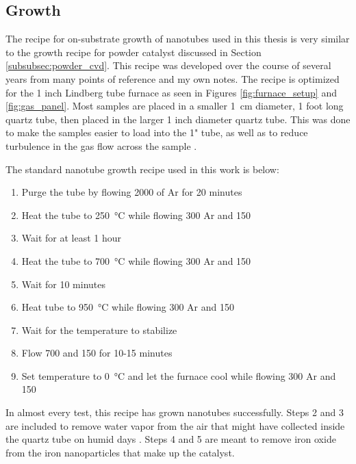 \subsection{Growth}
\label{subsubsec:substrate_cvd}

The recipe for on-substrate growth of nanotubes used in this thesis is very similar to the growth recipe for powder catalyst discussed in Section \ref{subsubsec:powder_cvd}. This recipe was developed over the course of several years from many points of reference \cite{Kong1998, Kong1998a, Dirks2010, Huang2003, Huang2004, Zhang2013, Hong2005} and my own notes. The recipe is optimized for the 1 inch Lindberg tube furnace as seen in Figures \ref{fig:furnace_setup} and \ref{fig:gas_panel}. Most samples are placed in a smaller \SI{1}{\centi\meter} diameter, 1 foot long quartz tube, then placed in the larger 1 inch diameter quartz tube. This was done to make the samples easier to load into the 1" tube, as well as to reduce turbulence in the gas flow across the sample \cite{Hong2005}. 

The standard nanotube growth recipe used in this work is below:

\begin{enumerate}
	\item Purge the tube by flowing \SI{2000}{\sccm} of Ar for 20 minutes
	\item Heat the tube to \SI{250}{\degreeCelsius} while flowing \SI{300}{\sccm} Ar and \SI{150}{\sccm} 
	\item Wait for at least 1 hour
	\item Heat the tube to \SI{700}{\degreeCelsius} while flowing \SI{300}{\sccm} Ar and \SI{150}{\sccm} 
	\item Wait for 10 minutes
	\item Heat tube to \SI{950}{\degreeCelsius} while flowing \SI{300}{\sccm} Ar and \SI{150}{\sccm} 
	\item Wait for the temperature to stabilize
	\item Flow \SI{700}{\sccm}  and \SI{150}{\sccm}  for 10-15 minutes
	\item Set temperature to \SI{0}{\degreeCelsius} and let the furnace cool while flowing \SI{300}{\sccm} Ar and \SI{150}{\sccm} 
\end{enumerate}

In almost every test, this recipe has grown nanotubes successfully. Steps 2 and 3 are included to remove water vapor from the air that might have collected inside the quartz tube on humid days \cite{Dirks2010}. Steps 4 and 5 are meant to remove iron oxide from the iron nanoparticles that make up the catalyst. 

